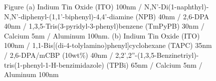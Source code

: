 \documentclass[
  letterpaper,
  DIV=11,
  numbers=noendperiod,
  oneside]{scrreprt}
\begin{document}
\begin{figure}
\begin{minipage}[t]{0.50\linewidth}
{{}

}

\subcaption{\label{fig-mcbpoled}}
\end{minipage}%
\newline
\begin{minipage}[t]{\linewidth}

{\centering 


}

\subcaption{\label{fig-c6oled}}
\end{minipage}%

\caption{\label{fig-oledextra}Figure (a) Indium Tin Oxide (ITO) 100nm /
N,N'-Di(1-naphthyl)-N,N'-diphenyl-(1,1'-biphenyl)-4,4'-diamine (NPB)
40nm / 2,6-DPA 40nm / 1,3,5-Tris(3-pyridyl-3-phenyl)benzene (TmPyPB)
30nm / Calcium 5nm / Aluminum 100nm. (b) Indium Tin Oxide (ITO) 100nm /
1,1-Bis{[}(di-4-tolylamino)phenyl{]}cyclohexane (TAPC) 35nm /
2,6-DPA/mCBP (10wt\%) 40nm /
2,2',2''-(1,3,5-Benzinetriyl)-tris(1-phenyl-1-H-benzimidazole) (TPBi)
65nm / Calcium 5nm / Aluminum 100nm}

\end{figure}
\end{document}
